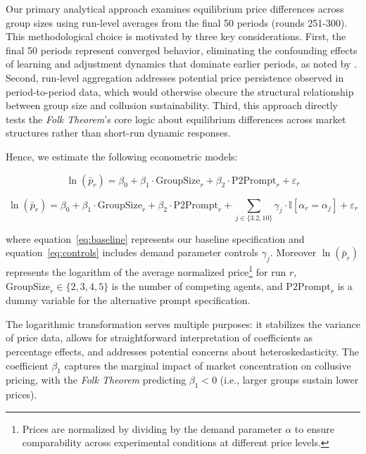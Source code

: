 Our primary analytical approach examines equilibrium price differences across group sizes using run-level averages from the final 50 periods (rounds 251-300). This methodological choice is motivated by three key considerations. First, the final 50 periods represent converged behavior, eliminating the confounding effects of learning and adjustment dynamics that dominate earlier periods, as noted by \textcite{fish_algorithmic_2025}. Second, run-level aggregation addresses potential price persistence observed in period-to-period data, which would otherwise obscure the structural relationship between group size and collusion sustainability. Third, this approach directly tests the \emph{Folk Theorem}'s core logic about equilibrium differences across market structures rather than short-run dynamic responses.

Hence, we estimate the following econometric models:

\begin{equation}\label{eq:baseline}
    \ln(\bar{p}_r) = \beta_0 + \beta_1 \cdot \text{GroupSize}_r + \beta_2 \cdot \text{P2Prompt}_r + \varepsilon_r
\end{equation}

\begin{equation}\label{eq:controls}
    \ln(\bar{p}_r) = \beta_0 + \beta_1 \cdot \text{GroupSize}_r + \beta_2 \cdot \text{P2Prompt}_r + \sum_{j \in \{3.2, 10\}} \gamma_j \cdot \mathbb{I}[\alpha_r = \alpha_j] + \varepsilon_r
\end{equation}

where equation~\eqref{eq:baseline} represents our baseline specification and equation~\eqref{eq:controls} includes demand parameter controls $\gamma_j$. Moreover $\ln(\bar{p}_r)$ represents the logarithm of the average normalized price\footnote{Prices are normalized by dividing by the demand parameter $\alpha$ to ensure comparability across experimental conditions at different price levels.} for run $r$, $\text{GroupSize}_r \in \{2,3,4,5\}$ is the number of competing agents, and $\text{P2Prompt}_r$ is a dummy variable for the alternative prompt specification.

The logarithmic transformation serves multiple purposes: it stabilizes the variance of price data, allows for straightforward interpretation of coefficients as percentage effects, and addresses potential concerns about heteroskedasticity. The coefficient $\beta_1$ captures the marginal impact of market concentration on collusive pricing, with the \emph{Folk Theorem} predicting $\beta_1 < 0$ (i.e., larger groups sustain lower prices).

